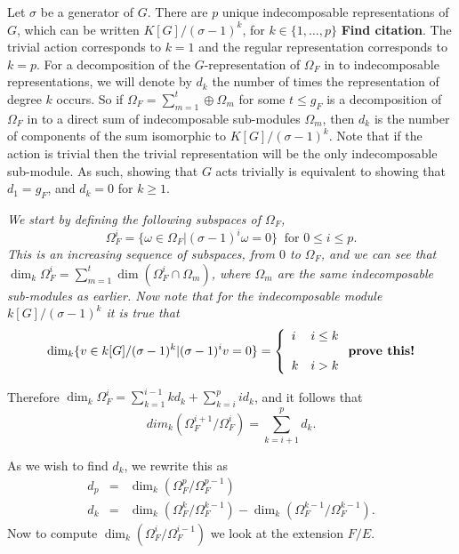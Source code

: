 \documentclass[11pt]{article} %
\theoremstyle{remark}\newtheorem*{rem}{Remark}
\begin{document}
Let $\sigma$ be a generator of $G$. 
There are $p$ unique indecomposable representations of $G$, which can be written $K[G]/(\sigma - 1)^k$, for $k\in \{1,\ldots, p\}$ \textbf{Find citation}.
The trivial action corresponds to $k=1$ and the regular representation corresponds to $k=p$.
For a decomposition of the $G$-representation of $\Omega_F$ in to indecomposable representations, we will denote by $d_k$ the number of times the representation of degree $k$ occurs.
So if $\Omega_F = \sum_{m=1}^t \oplus \Omega_m$ for some $t\leq g_F$ is a decomposition of $\Omega_F$ in to a direct sum of indecomposable sub-modules $\Omega_m$, then $d_k$ is the number of components of the sum isomorphic to $K[G]/(\sigma -1)^k.$
Note that if the action is trivial then the trivial representation will be the only indecomposable sub-module. 
As such, showing that $G$ acts trivially is equivalent to showing that $d_1 = g_F$, and $d_k= 0 $ for $k \geq 1$.
{\em
We start by defining the following subspaces of $\Omega_F$,
\begin{equation*}
	\Omega_F^i = \{\omega\in \Omega_F | (\sigma - 1)^i\omega=0\}\ \mbox{ for } 0\leq i \leq p.
\end{equation*}
This is an increasing sequence of subspaces, from $0$ to $\Omega_F$, and we can see that $\dim_k\Omega_F^i = \sum_{m=1}^t\dim(\Omega_F^i \cap \Omega_m)$, where $\Omega_m$ are the same indecomposable sub-modules as earlier.
Now note that for the indecomposable module $k[G]/(\sigma - 1)^k$ it is true that 
\[
 \dim_k\{v \in k[G]/(\sigma - 1)^k | (\sigma - 1)^iv = 0\} = \left\{ \begin{array}{ll}
                                                                      i & i\leq k \\
\\
								      k & i > k
                                                                     \end{array} \right. \mbox{\textbf{prove this!}}
\]

Therefore $\dim_k\Omega_F^i = \sum _{k=1}^{i-1} kd_k + \sum_{k=i}^p id_k$, and it follows that 
\[
dim_k(\Omega_F^{i+1}/\Omega_F^i) = \sum_{k=i+1}^p d_k.
\]

As we wish to find $d_k$, we rewrite this as 
\begin{eqnarray*}
d_p & = & \dim_k(\Omega_F^p/\Omega_F^{p-1}) \\
d_k & = & \dim_k(\Omega_F^k/\Omega_F^{k-1}) - \dim_k(\Omega_F^{k-1}/\Omega_F^{k-1}).
\end{eqnarray*}
Now to compute $\dim_k(\Omega_F^i/\Omega_F^{i-1})$ we look at the extension $F/E$.

}
\end{document}
